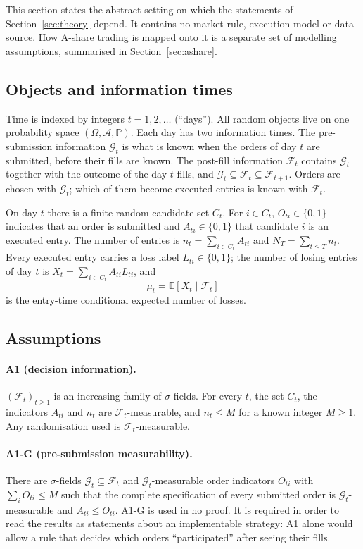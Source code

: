 \documentclass[11pt]{article}
\theoremstyle{remark}
\newcommand{\E}{\mathbb{E}}
\newcommand{\Prob}{\mathbb{P}}
\newcommand{\cF}{\mathcal{F}}
\newcommand{\cG}{\mathcal{G}}
\begin{document}
This section states the abstract setting on which the statements of Section~\ref{sec:theory}
depend. It contains no market rule, execution model or data source. How A-share trading is mapped
onto it is a separate set of modelling assumptions, summarised in Section~\ref{sec:ashare}.

\subsection{Objects and information times}

Time is indexed by integers $t=1,2,\dots$ (``days''). All random objects live on one probability
space $(\Omega,\mathcal{A},\Prob)$. Each day has two information times. The pre-submission
information $\cG_t$ is what is known when the orders of day $t$ are submitted, before their
fills are known. The post-fill information $\cF_t$ contains $\cG_t$ together with the outcome of
the day-$t$ fills, and $\cG_t\subseteq\cF_t\subseteq\cF_{t+1}$. Orders are chosen with $\cG_t$;
which of them become executed entries is known with $\cF_t$.

On day $t$ there is a finite random candidate set $C_t$. For $i\in C_t$, $O_{ti}\in\{0,1\}$
indicates that an order is submitted and $A_{ti}\in\{0,1\}$ that candidate $i$ is an executed
entry. The number of entries is $n_t=\sum_{i\in C_t}A_{ti}$ and $N_T=\sum_{t\le T}n_t$. Every
executed entry carries a loss label $L_{ti}\in\{0,1\}$; the number of losing entries of day $t$
is $X_t=\sum_{i\in C_t}A_{ti}L_{ti}$, and
\[
\mu_t=\E[X_t\mid\cF_t]
\]
is the entry-time conditional expected number of losses.

\subsection{Assumptions}

\paragraph{A1 (decision information).}
$(\cF_t)_{t\ge1}$ is an increasing family of $\sigma$-fields. For every $t$, the set $C_t$, the
indicators $A_{ti}$ and $n_t$ are $\cF_t$-measurable, and $n_t\le M$ for a known integer
$M\ge1$. Any randomisation used is $\cF_t$-measurable.

\paragraph{A1-G (pre-submission measurability).}
There are $\sigma$-fields $\cG_t\subseteq\cF_t$ and $\cG_t$-measurable order indicators
$O_{ti}$ with $\sum_iO_{ti}\le M$ such that the complete specification of every submitted order
is $\cG_t$-measurable and $A_{ti}\le O_{ti}$. A1-G is used in no proof. It is required in order
to read the results as statements about an implementable strategy: A1 alone would allow a rule
that decides which orders ``participated'' after seeing their fills.
\end{document}
